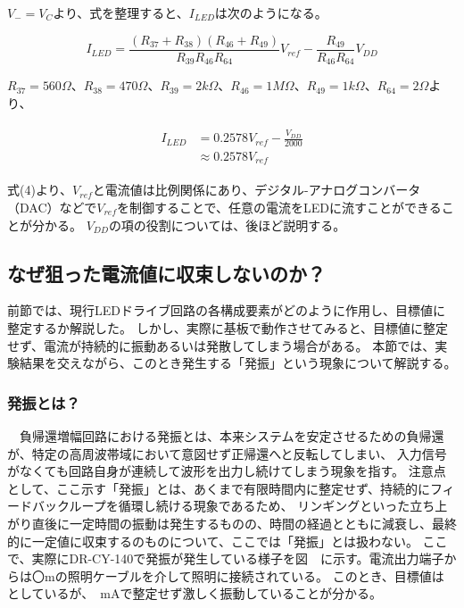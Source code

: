 \documentclass{ltjsarticle}
\begin{document}
$V_{-} = V_{C}$より、式を整理すると、$I_{LED}$は次のようになる。

\begin{equation}
    I_{LED} = \frac{(R_{37}+R_{38})(R_{46}+R_{49})}{R_{39}R_{46}R_{64}}V_{ref} - \frac{R_{49}}{R_{46}R_{64}}V_{DD}
\end{equation}


$R_{37}=560Ω$、$R_{38}=470Ω$、$R_{39}=2kΩ$、$R_{46}=1MΩ$、$R_{49}=1kΩ$、$R_{64}=2Ω$より、

\begin{gather}
    \begin{aligned}
        I_{LED} &= 0.2578V_{ref} - \frac{V_{DD}}{2000} \\
        &\approx 0.2578V_{ref}
    \end{aligned}
\end{gather}

式(4)より、$V_{ref}$と電流値は比例関係にあり、デジタル-アナログコンバータ（DAC）などで$V_{ref}$を制御することで、任意の電流をLEDに流すことができることが分かる。
$V_{DD}$の項の役割については、後ほど説明する。

\subsection{なぜ狙った電流値に収束しないのか？}
前節では、現行LEDドライブ回路の各構成要素がどのように作用し、目標値に整定するか解説した。
しかし、実際に基板で動作させてみると、目標値に整定せず、電流が持続的に振動あるいは発散してしまう場合がある。
本節では、実験結果を交えながら、このとき発生する「発振」という現象について解説する。
\subsubsection{発振とは？}
　負帰還増幅回路における発振とは、本来システムを安定させるための負帰還が、特定の高周波帯域において意図せず正帰還へと反転してしまい、
入力信号がなくても回路自身が連続して波形を出力し続けてしまう現象を指す。
注意点として、ここ示す「発振」とは、あくまで有限時間内に整定せず、持続的にフィードバックループを循環し続ける現象であるため、
リンギングといった立ち上がり直後に一定時間の振動は発生するものの、時間の経過とともに減衰し、最終的に一定値に収束するのものについて、ここでは「発振」とは扱わない。
ここで、実際にDR-CY-140で発振が発生している様子を図　に示す。電流出力端子からは〇mの照明ケーブルを介して照明に接続されている。
このとき、目標値は　としているが、　mAで整定せず激しく振動していることが分かる。
\end{document}
